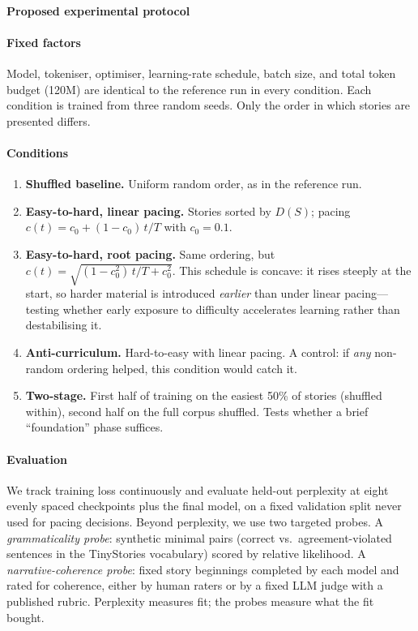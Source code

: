 \paragraph{Proposed experimental protocol}

\paragraph{Fixed factors}

Model, tokeniser, optimiser, learning-rate schedule, batch size, and
total token budget (120M) are identical to the reference run in every
condition. Each condition is trained from three random seeds. Only the
order in which stories are presented differs.

\paragraph{Conditions}

\begin{enumerate}
\item[(a)] \textbf{Shuffled baseline.} Uniform random order, as in the
reference run.
\item[(b)] \textbf{Easy-to-hard, linear pacing.} Stories sorted by
$D(S)$; pacing $c(t) = c_0 + (1 - c_0)\, t/T$ with $c_0 = 0.1$.
\item[(c)] \textbf{Easy-to-hard, root pacing.} Same ordering, but
$c(t) = \sqrt{(1-c_0^2)\, t/T + c_0^2}$. This schedule is concave:
it rises steeply at the start, so harder material is introduced
\emph{earlier} than under linear pacing---testing whether early
exposure to difficulty accelerates learning rather than destabilising it.
\item[(d)] \textbf{Anti-curriculum.} Hard-to-easy with linear pacing.
A control: if \emph{any} non-random ordering helped, this condition
would catch it.
\item[(e)] \textbf{Two-stage.} First half of training on the easiest
50\% of stories (shuffled within), second half on the full corpus
shuffled. Tests whether a brief ``foundation'' phase suffices.
\end{enumerate}

\paragraph{Evaluation}

We track training loss continuously and evaluate held-out perplexity at
eight evenly spaced checkpoints plus the final model, on a fixed
validation split never used for pacing decisions. Beyond perplexity, we
use two targeted probes. A \emph{grammaticality probe}: synthetic
minimal pairs (correct vs.\ agreement-violated sentences in the
TinyStories vocabulary) scored by relative likelihood. A
\emph{narrative-coherence probe}: fixed story beginnings completed by
each model and rated for coherence, either by human raters or by a
fixed LLM judge with a published rubric. Perplexity measures fit;
the probes measure what the fit bought.

